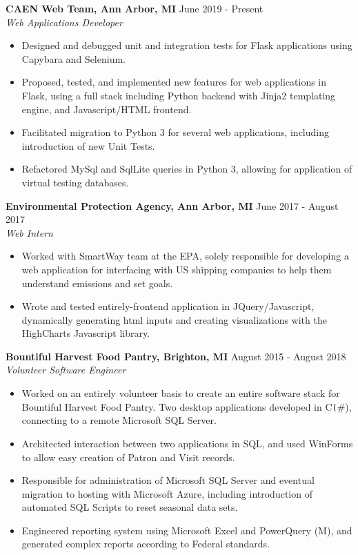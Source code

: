\documentclass[overlapped]{res}
\begin{document}
\begin{resume}
    \textbf{CAEN Web Team, Ann Arbor, MI}
    \hfill June 2019 - Present \\
    {\sl Web Applications Developer}
    \begin{itemize}  \itemsep -2pt %
        \item Designed and debugged unit and integration tests for Flask applications using Capybara and Selenium.
        \item Proposed, tested, and implemented new features for web applications in Flask, using a full stack including Python backend with Jinja2 templating engine, and Javascript/HTML frontend.
        \item Facilitated migration to Python 3 for several web applications, including introduction of new Unit Tests.
        \item Refactored MySql and SqlLite queries in Python 3, allowing for application of virtual testing databases.

    \end{itemize}

    \textbf{Environmental Protection Agency, Ann Arbor, MI}
    \hfill June 2017 - August 2017 \\
    {\sl Web Intern}
    \begin{itemize}  \itemsep -2pt %
        \item Worked with SmartWay team at the EPA, solely responsible for developing a web application for interfacing with US shipping companies to help them understand emissions and set goals.
        \item Wrote and tested entirely-frontend application in JQuery/Javascript, dynamically generating html inputs and creating visualizations with the HighCharts Javascript library.

    \end{itemize}

    \textbf{Bountiful Harvest Food Pantry, Brighton, MI}
    \hfill August 2015 - August 2018 \\
    {\sl Volunteer Software Engineer}
    \begin{itemize}  \itemsep -2pt %
        \item Worked on an entirely volunteer basis to create an entire software stack for Bountiful Harvest Food Pantry. Two desktop applications developed in C\texttt(\#), connecting to a remote Microsoft SQL Server.
        \item Architected interaction between two applications in SQL, and used WinForms to allow easy creation of Patron and Visit records.
        \item Responsible for administration of Microsoft SQL Server and eventual migration to hosting with Microsoft Azure, including introduction of automated SQL Scripts to reset seasonal data sets.
        \item Engineered reporting system using Microsoft Excel and PowerQuery (M), and generated complex reports according to Federal standards.
    \end{itemize}


\end{resume}
\end{document}
